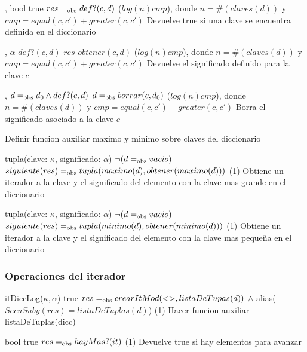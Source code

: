 {   ,
    }
{bool}
{true}
{$res =_{\mathrm{obs}} def?(c, d)$}
{\bigo($log(n)cmp$), donde $n = \#(claves(d))$ y $cmp = equal(c, c')+greater(c, c')$}
{}
{Devuelve true si una clave se encuentra definida en el diccionario}

{   ,
    }
{$\alpha$}
{$def?(c, d)$}
{$res$ \igobs $obtener(c, d)$}
{\bigo($log(n)cmp$), donde $n = \#(claves(d))$ y $cmp = equal(c, c')+greater(c, c')$}
{}
{Devuelve el significado definido para la clave $c$}

{   ,
    }
{}
{$d =_{\mathrm{obs}} d_0 \land def?(c, d)$}
{$d =_{\mathrm{obs}} borrar(c, d_0)$}
{\bigo($log(n)cmp$), donde $n = \#(claves(d))$ y $cmp = equal(c, c')+greater(c, c')$}
{}
{Borra el significado asociado a la clave $c$}


\cuidado Definir funcion auxiliar maximo y minimo sobre claves del diccionario

{   }
{tupla(clave: $\kappa$, significado: $\alpha$)}
{$\neg (d =_{\mathrm{obs}} vacio)$}
{$siguiente(res) =_{\mathrm{obs}} tupla(maximo(d), obtener(maximo(d)))$}
{\bigo(1)}
{}
{Obtiene un iterador a la clave y el significado del elemento con la clave 
    mas grande en el diccionario}

{   }
{tupla(clave: $\kappa$, significado: $\alpha$)}
{$\neg (d =_{\mathrm{obs}} vacio)$}
{$siguiente(res) =_{\mathrm{obs}} tupla(minimo(d), obtener(minimo(d)))$}
{\bigo(1)}
{}
{Obtiene un iterador a la clave y el significado del elemento con la clave 
    mas pequeña en el diccionario}



\subsubsection{Operaciones del iterador}

{   }
{itDiccLog($\kappa, \alpha$)}
{true}
{$res =_{\mathrm{obs}} crearItMod(<>, listaDeTupas(d))$ $\land$ alias($SecuSuby(res) = listaDeTuplas(d)$)}
{\bigo(1)}
{\cuidado Hacer funcion auxiliar listaDeTuplas(dicc)}
{}

{    }
{bool}
{true}
{$res =_{\mathrm{obs}} hayMas?(it)$}
{\bigo(1)}
{}
{Devuelve true si hay elementos para avanzar}

